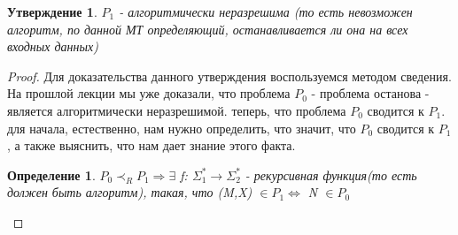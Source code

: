 \documentclass[a4paper]{article}
\newtheorem{statement}{Утверждение}
\newtheorem{definition}{Определение}
\begin{document}
{\begin{statement}
$P_1$ - алгоритмически неразрешима (то есть невозможен алгоритм, по данной МТ определяющий, останавливается ли она на всех входных данных)
\end{statement}
\begin{proof}
Для доказательства данного утверждения воспользуемся методом сведения.
На прошлой лекции мы уже доказали, что проблема $P_0$ - проблема останова - является алгоритмически неразрешимой. 
 теперь, что проблема $P_0$ сводится к $P_1$.
 для начала, естественно, нам нужно определить, что значит, что $P_0$ сводится к $P_1$, а также выяснить, что нам дает знание этого факта.
\begin{definition}
$P_0 \prec_R P_1 \Rightarrow \exists$ f: $\Sigma^{*}_1$$\rightarrow \Sigma^{*}_2$ - рекурсивная функция(то есть должен быть алгоритм), такая, что (M,X) $\in P_1 \Leftrightarrow$ N $\in P_0$
\end{definition}


\end{proof}}
\end{document}
